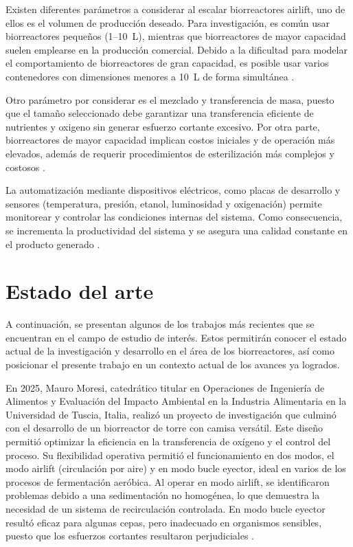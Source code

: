 \documentclass[11pt,tesis,twoside,openright,spanish]{upiiztt}
\begin{document}
Existen diferentes parámetros a considerar al escalar biorreactores airlift, uno de
ellos es el volumen de producción deseado. Para investigación, es común usar
biorreactores pequeños (1--10~L), mientras que biorreactores de mayor capacidad
suelen emplearse en la producción comercial. Debido a la dificultad para modelar
el comportamiento de biorreactores de gran capacidad, es posible usar varios
contenedores con dimensiones menores a 10~L de forma simultánea \cite{Moresi2025}.

Otro parámetro por considerar es el mezclado y transferencia de masa, puesto que
el tamaño seleccionado debe garantizar una transferencia eficiente de nutrientes y
oxigeno sin generar esfuerzo cortante excesivo. Por otra parte, biorreactores de
mayor capacidad implican costos iniciales y de operación más elevados, además
de requerir procedimientos de esterilización más complejos y costosos \cite{Moresi2025,Micheletti2006}.

La automatización mediante dispositivos eléctricos, como placas de desarrollo y
sensores (temperatura, presión, etanol, luminosidad y oxigenación) permite
monitorear y controlar las condiciones internas del sistema. Como consecuencia,
se incrementa la productividad del sistema y se asegura una calidad constante en
el producto generado \cite{Paredes2024}.

\chapter{Estado del arte}\label{cap5}

A continuación, se presentan algunos de los trabajos más recientes que se
encuentran en el campo de estudio de interés. Estos permitirán conocer el estado
actual de la investigación y desarrollo en el área de los biorreactores, así como
posicionar el presente trabajo en un contexto actual de los avances ya logrados.

En 2025, Mauro Moresi, catedrático titular en Operaciones de Ingeniería de
Alimentos y Evaluación del Impacto Ambiental en la Industria Alimentaria en la
Universidad de Tuscia, Italia, realizó un proyecto de investigación que culminó con
el desarrollo de un biorreactor de torre con camisa versátil. Este diseño permitió
optimizar la eficiencia en la transferencia de oxígeno y el control del proceso. Su
flexibilidad operativa permitió el funcionamiento en dos modos, el modo airlift
(circulación por aire) y en modo bucle eyector, ideal en varios de los procesos de
fermentación aeróbica. Al operar en modo airlift, se identificaron problemas debido
a una sedimentación no homogénea, lo que demuestra la necesidad de un sistema
de recirculación controlada. En modo bucle eyector resultó eficaz para algunas
cepas, pero inadecuado en organismos sensibles, puesto que los esfuerzos
cortantes resultaron perjudiciales \cite{Moresi2025}.
\end{document}
